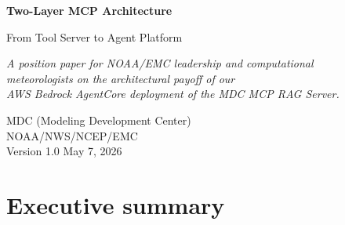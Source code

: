 \documentclass[11pt,letterpaper]{article}
\begin{document}
\begin{titlepage}
\centering
\vspace*{1.2in}
{\color{noaablue}\Huge\bfseries Two-Layer MCP Architecture\par}
\vspace{0.25in}
{\color{accent}\LARGE From Tool Server to Agent Platform\par}
\vspace{0.6in}

\begin{tcolorbox}[colback=accentlight!30, colframe=accent,
                  width=0.8\linewidth, boxrule=0.4pt, arc=3pt]
\centering
\itshape A position paper for NOAA/EMC leadership and computational\\
meteorologists on the architectural payoff of our\\
AWS Bedrock AgentCore deployment of the MDC MCP RAG Server.
\end{tcolorbox}

\vfill
{\normalsize
MDC (Modeling Development Center)\\
NOAA/NWS/NCEP/EMC\\
\vspace{0.3in}
\color{subtle}
Version 1.0 \quad\textbullet\quad May 7, 2026\par}
\end{titlepage}

\section*{Executive summary}
\end{document}
